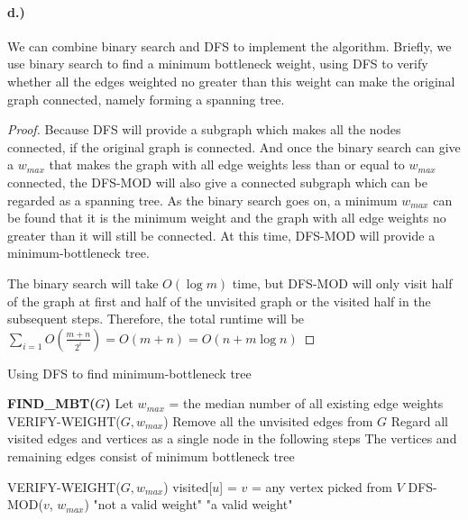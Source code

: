 \documentclass[letter,12pt]{article}
\begin{document}
\paragraph*{d.)} We can combine binary search and DFS to implement
the algorithm. Briefly, we use binary search to find a minimum 
bottleneck weight, using DFS to verify whether all the edges weighted 
no greater than this weight can make the original graph connected,
namely forming a spanning tree. 

\begin{proof}
Because DFS will provide a subgraph which makes all the nodes 
connected, if the original graph is connected. And once the binary
search can give a $w_{max}$ that makes the graph with all edge weights
less than or equal to $w_{max}$ connected, the DFS-MOD will also give
a connected subgraph which can be regarded as a spanning tree. As 
the binary search goes on, a minimum $w_{max}$ can be found that
it is the minimum weight and the graph with all edge weights no greater
than it will still be connected. At this time, DFS-MOD will provide
a minimum-bottleneck tree.

The binary search will take $O(\log m)$ time, but DFS-MOD will only
visit half of the graph at first and half of the unvisited graph or the
visited half in the subsequent steps. Therefore, the total runtime
will be $\sum\limits_{i=1}O(\frac{m+n}{2^i}) = O(m+n)=O(n+m\log n)$
\end{proof}

\begin{algorithm}
\caption{Using DFS to find minimum-bottleneck tree}
\begin{algorithmic}
\STATE \textbf{FIND\_MBT($G$)}
\STATE Let $w_{max}$ = the median number of all existing edge 
weights
\STATE VERIFY-WEIGHT($G, w_{max}$)
    \STATE Remove all the unvisited edges from $G$
\ELSE 
    \STATE Regard all visited edges and vertices as a single node in the
following steps
\ENDIF
\ENDWHILE
\STATE The vertices and remaining edges consist of minimum 
bottleneck tree
\end{algorithmic}
\end{algorithm}

\begin{algorithm}
\begin{algorithmic}
\STATE VERIFY-WEIGHT($G, w_{max}$)
    \STATE visited[$u$] = \FALSE
\ENDFOR
\STATE $v$ = any vertex picked from $V$
\STATE DFS-MOD($v$, $w_{max}$)
        \RETURN "not a valid weight"
        \ELSE \RETURN "a valid weight"
    \ENDIF
\ENDFOR
\end{algorithmic}
\end{algorithm}
\end{document}
